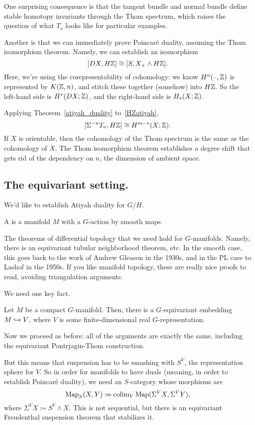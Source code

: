 One surprising consequence is that the tangent bundle and normal bundle define stable homotopy invariants through
the Thom spectrum, which raises the question of what $T_\nu$ looks like for particular examples.

Another is that we can immediately prove Poincaré duality, assuming the Thom isomorphism theorem. Namely, we can
establish an isomorphism
\begin{equation}
\label{HZatiyah}
[DX, H\mathbb Z] \cong [S, X_+\wedge H\mathbb Z].
\end{equation}
Here, we're using the corepresentability of cohomology: we know $H^n(\text{--},\mathbb Z)$ is represented by $K(\mathbb Z, n)$, and
stitch these together (somehow) into $H\mathbb Z$. So the left-hand side is $H^*(DX;\mathbb Z)$, and the right-hand side is
$H_*(X;\mathbb Z)$.

Applying Theorem~\ref{atiyah_duality} to~\eqref{HZatiyah},
\[[\Sigma^{-n} T_\nu, H\mathbb Z]\cong H^{m-*}(X;\mathbb Z).\]
If $X$ is orientable, then the cohomology of the Thom spectrum is the same as the cohomology of $X$. The Thom
isomorphism theorem establishes a degree shift that gets rid of the dependency on $n$, the dimension of ambient
space.
\subsection*{The equivariant setting.}
We'd like to establish Atiyah duality for $G/H$.
\begin{defn}
A  is a manifold $M$ with a $G$-action by smooth maps.
\end{defn}
The theorems of differential topology that we need hold for $G$-manifolds. Namely, there is an equivariant tubular
neighborhood theorem, etc. In the smooth case, this goes back to the work of Andrew Gleason in the 1930s, and in
the PL case to Lashof in the 1950s. If you like manifold topology, these are really nice proofs to read, avoiding
triangulation arguments.

We need one key fact.
\begin{thm}
Let $M$ be a compact $G$-manifold. Then, there is a $G$-equivariant embedding $M\hookrightarrow V$, where $V$ is some
finite-dimensional real $G$-representation.
\end{thm}
Now we proceed as before: all of the arguments are exactly the same, including the equivariant Pontrjagin-Thom
construction.

But this means that suspension has to be smashing with $S^V$, the representation sphere for $V$. So in order for
manifolds to have duals (meaning, in order to establish Poincaré duality), we need an $S$-category whose morphisms
are
\[\operatorname{Map}_S(X,Y)\coloneqq \operatorname{colim}_V \operatorname{Map}(\Sigma^V X, \Sigma^V Y),\]
where $\Sigma^V X\coloneqq S^V\wedge X$. This is not sequential, but there is an equivariant Freudenthal suspension
theorem that stabilizes it.

